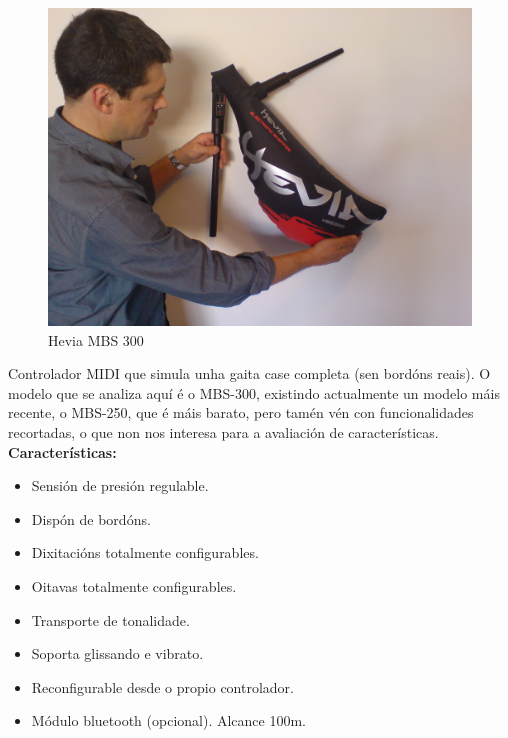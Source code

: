  \begin{figure}[htbp]
   \centering
   \includegraphics[scale=0.1,keepaspectratio=true]{./imagenes/hevia-mbs-300.jpg}
   \caption[Hevia MBS 300]{Hevia MBS 300 \cite{HeviaMBS300}}
   \label{figura:HeviaMBS300}
  \end{figure}

  Controlador MIDI que simula unha gaita case completa (sen bordóns reais). O
  modelo que se analiza aquí é o MBS-300, existindo actualmente un modelo máis
  recente, o MBS-250, que é máis barato, pero tamén vén con funcionalidades
  recortadas, o que non nos interesa para a avaliación de características. \\

  \textbf{Características:}

  \begin{itemize}
   \item Sensión de presión regulable.
   \item Dispón de bordóns.
   \item Dixitacións totalmente configurables.
   \item Oitavas totalmente configurables.
   \item Transporte de tonalidade.
   \item Soporta glissando e vibrato.
   \item Reconfigurable desde o propio controlador.
   \item Módulo bluetooth (opcional). Alcance 100m.
  \end{itemize}

